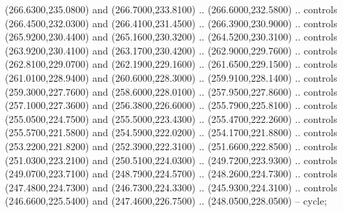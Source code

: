 {\begin{scope}[y=0.80pt, x=0.80pt, yscale=-1, xscale=1, inner sep=0pt, outer sep=0pt, #1]
      (266.6300,235.0800) and (266.7000,233.8100) .. (266.6000,232.5800) .. controls
      (266.4500,232.0300) and (266.4100,231.4500) .. (266.3900,230.9000) .. controls
      (265.9200,230.4400) and (265.1600,230.3200) .. (264.5200,230.3100) .. controls
      (263.9200,230.4100) and (263.1700,230.4200) .. (262.9000,229.7600) .. controls
      (262.8100,229.0700) and (262.1900,229.1600) .. (261.6500,229.1500) .. controls
      (261.0100,228.9400) and (260.6000,228.3000) .. (259.9100,228.1400) .. controls
      (259.3000,227.7600) and (258.6000,228.0100) .. (257.9500,227.8600) .. controls
      (257.1000,227.3600) and (256.3800,226.6000) .. (255.7900,225.8100) .. controls
      (255.0500,224.7500) and (255.5000,223.4300) .. (255.4700,222.2600) .. controls
      (255.5700,221.5800) and (254.5900,222.0200) .. (254.1700,221.8800) .. controls
      (253.2200,221.8200) and (252.3900,222.3100) .. (251.6600,222.8500) .. controls
      (251.0300,223.2100) and (250.5100,224.0300) .. (249.7200,223.9300) .. controls
      (249.0700,223.7100) and (248.7900,224.5700) .. (248.2600,224.7300) .. controls
      (247.4800,224.7300) and (246.7300,224.3300) .. (245.9300,224.3100) .. controls
      (246.6600,225.5400) and (247.4600,226.7500) .. (248.0500,228.0500) -- cycle;


\end{scope}}

